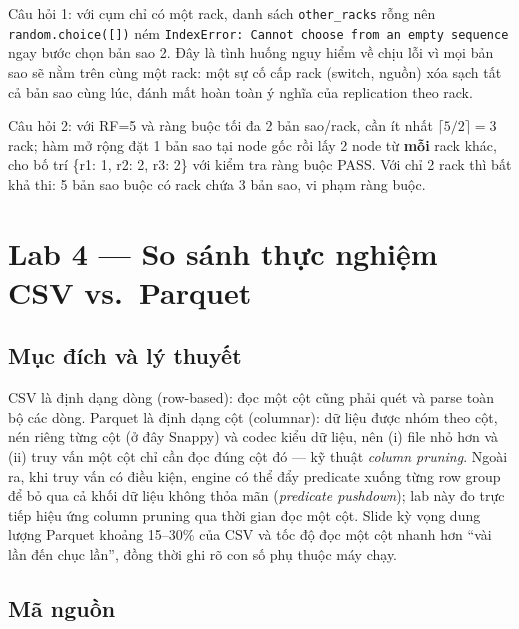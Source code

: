 \documentclass[12pt,a4paper,oneside]{article}
\begin{document}
Câu hỏi 1: với cụm chỉ có một rack, danh sách \texttt{other\_racks} rỗng nên \texttt{random.choice([])} ném \texttt{IndexError: Cannot choose from an empty sequence} ngay bước chọn bản sao 2. Đây là tình huống nguy hiểm về chịu lỗi vì mọi bản sao sẽ nằm trên cùng một rack: một sự cố cấp rack (switch, nguồn) xóa sạch tất cả bản sao cùng lúc, đánh mất hoàn toàn ý nghĩa của replication theo rack.

Câu hỏi 2: với RF=5 và ràng buộc tối đa 2 bản sao/rack, cần ít nhất $\lceil 5/2 \rceil = 3$ rack; hàm mở rộng đặt 1 bản sao tại node gốc rồi lấy 2 node từ \textbf{mỗi} rack khác, cho bố trí \{r1: 1, r2: 2, r3: 2\} với kiểm tra ràng buộc PASS. Với chỉ 2 rack thì bất khả thi: 5 bản sao buộc có rack chứa 3 bản sao, vi phạm ràng buộc.

\section{Lab 4 --- So sánh thực nghiệm CSV vs.\ Parquet}
\label{sec:lab4}

\subsection{Mục đích và lý thuyết}

CSV là định dạng dòng (row-based): đọc một cột cũng phải quét và parse toàn bộ các dòng. Parquet là định dạng cột (columnar): dữ liệu được nhóm theo cột, nén riêng từng cột (ở đây Snappy) và codec kiểu dữ liệu, nên (i) file nhỏ hơn và (ii) truy vấn một cột chỉ cần đọc đúng cột đó --- kỹ thuật \emph{column pruning}. Ngoài ra, khi truy vấn có điều kiện, engine có thể đẩy predicate xuống từng row group để bỏ qua cả khối dữ liệu không thỏa mãn (\emph{predicate pushdown}); lab này đo trực tiếp hiệu ứng column pruning qua thời gian đọc một cột. Slide kỳ vọng dung lượng Parquet khoảng 15--30\% của CSV và tốc độ đọc một cột nhanh hơn ``vài lần đến chục lần'', đồng thời ghi rõ con số phụ thuộc máy chạy.

\subsection{Mã nguồn}


\end{document}
